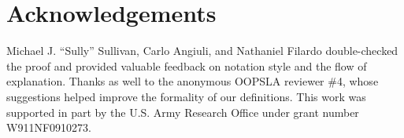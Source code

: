 \documentclass[10pt,times,numbers]{../sigplanconf}
\begin{document}






\section{Acknowledgements}

Michael J. ``Sully'' Sullivan, Carlo Angiuli, and Nathaniel Filardo double-checked the proof and provided valuable feedback on notation style and the flow of explanation.
Thanks as well to the anonymous OOPSLA reviewer \#4, whose suggestions helped improve the formality of our definitions.
This work was supported in part by the U.S. Army Research Office under grant number W911NF0910273.


{}
\end{document}
